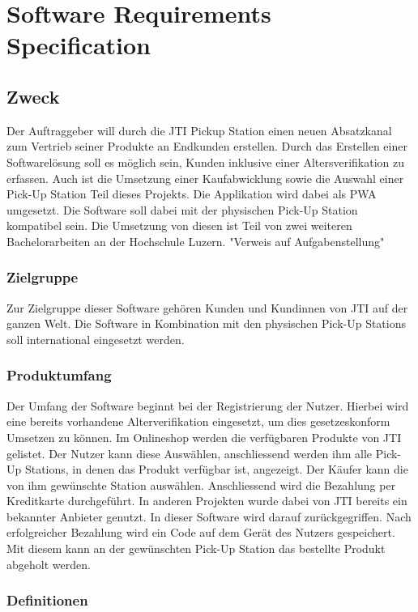 \section{Software Requirements Specification}\label{RSR}

\subsection{Zweck}
Der Auftraggeber will durch die JTI Pickup Station einen neuen Absatzkanal zum Vertrieb seiner Produkte an Endkunden erstellen. Durch das Erstellen einer Softwarelösung soll es möglich sein, Kunden inklusive einer Altersverifikation zu erfassen. Auch ist die Umsetzung einer Kaufabwicklung sowie die Auswahl einer Pick-Up Station Teil dieses Projekts. Die Applikation wird dabei als \ac{PWA} umgesetzt. Die Software soll dabei mit der physischen Pick-Up Station kompatibel sein. Die Umsetzung von diesen ist Teil von zwei weiteren Bachelorarbeiten an der Hochschule Luzern.  
"Verweis auf Aufgabenstellung"
\subsubsection{Zielgruppe}
Zur Zielgruppe dieser Software gehören Kunden und Kundinnen von \ac{JTI} auf der ganzen Welt. Die Software in Kombination mit den physischen Pick-Up Stations soll international eingesetzt werden. 
\subsubsection{Produktumfang}
Der Umfang der Software beginnt bei der Registrierung der Nutzer. Hierbei wird eine bereits vorhandene Alterverifikation eingesetzt, um dies gesetzeskonform Umsetzen zu können. Im Onlineshop werden die verfügbaren Produkte von \ac{JTI} gelistet. Der Nutzer kann diese Auswählen, anschliessend werden ihm alle Pick-Up Stations, in denen das Produkt verfügbar ist, angezeigt. Der Käufer kann die von ihm gewünschte Station auswählen. Anschliessend wird die Bezahlung per Kreditkarte durchgeführt. In anderen Projekten wurde dabei von \ac{JTI} bereits ein bekannter Anbieter genutzt. In dieser Software wird darauf zurückgegriffen. Nach erfolgreicher Bezahlung wird ein Code auf dem Gerät des Nutzers gespeichert. Mit diesem kann an der gewünschten Pick-Up Station das bestellte Produkt abgeholt werden. 

\subsubsection{Definitionen}
